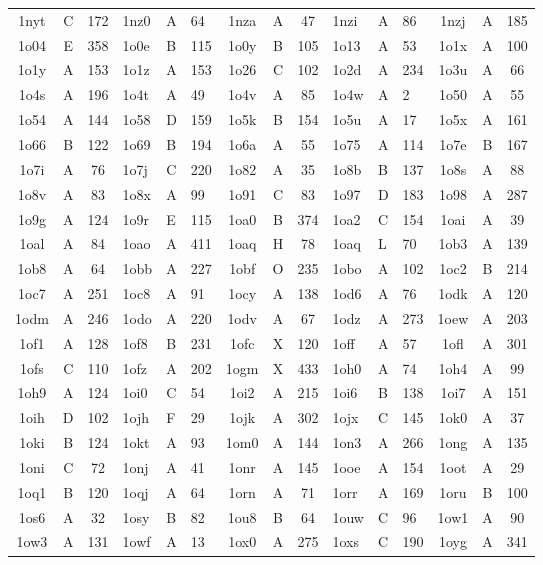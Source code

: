 \begin{longtable}{|c|c|c| a|a|a| c|c|c| a|a|a| c|c|c|}
1nyt & C & 172 & 1nz0 & A & 64 & 1nza & A & 47 & 1nzi & A & 86 & 1nzj & A & 185\\
1o04 & E & 358 & 1o0e & B & 115 & 1o0y & B & 105 & 1o13 & A & 53 & 1o1x & A & 100\\
1o1y & A & 153 & 1o1z & A & 153 & 1o26 & C & 102 & 1o2d & A & 234 & 1o3u & A & 66\\
1o4s & A & 196 & 1o4t & A & 49 & 1o4v & A & 85 & 1o4w & A & 2 & 1o50 & A & 55\\
1o54 & A & 144 & 1o58 & D & 159 & 1o5k & B & 154 & 1o5u & A & 17 & 1o5x & A & 161\\
1o66 & B & 122 & 1o69 & B & 194 & 1o6a & A & 55 & 1o75 & A & 114 & 1o7e & B & 167\\
1o7i & A & 76 & 1o7j & C & 220 & 1o82 & A & 35 & 1o8b & B & 137 & 1o8s & A & 88\\
1o8v & A & 83 & 1o8x & A & 99 & 1o91 & C & 83 & 1o97 & D & 183 & 1o98 & A & 287\\
1o9g & A & 124 & 1o9r & E & 115 & 1oa0 & B & 374 & 1oa2 & C & 154 & 1oai & A & 39\\
1oal & A & 84 & 1oao & A & 411 & 1oaq & H & 78 & 1oaq & L & 70 & 1ob3 & A & 139\\
1ob8 & A & 64 & 1obb & A & 227 & 1obf & O & 235 & 1obo & A & 102 & 1oc2 & B & 214\\
1oc7 & A & 251 & 1oc8 & A & 91 & 1ocy & A & 138 & 1od6 & A & 76 & 1odk & A & 120\\
1odm & A & 246 & 1odo & A & 220 & 1odv & A & 67 & 1odz & A & 273 & 1oew & A & 203\\
1of1 & A & 128 & 1of8 & B & 231 & 1ofc & X & 120 & 1off & A & 57 & 1ofl & A & 301\\
1ofs & C & 110 & 1ofz & A & 202 & 1ogm & X & 433 & 1oh0 & A & 74 & 1oh4 & A & 99\\
1oh9 & A & 124 & 1oi0 & C & 54 & 1oi2 & A & 215 & 1oi6 & B & 138 & 1oi7 & A & 151\\
1oih & D & 102 & 1ojh & F & 29 & 1ojk & A & 302 & 1ojx & C & 145 & 1ok0 & A & 37\\
1oki & B & 124 & 1okt & A & 93 & 1om0 & A & 144 & 1on3 & A & 266 & 1ong & A & 135\\
1oni & C & 72 & 1onj & A & 41 & 1onr & A & 145 & 1ooe & A & 154 & 1oot & A & 29\\
1oq1 & B & 120 & 1oqj & A & 64 & 1orn & A & 71 & 1orr & A & 169 & 1oru & B & 100\\
1os6 & A & 32 & 1osy & B & 82 & 1ou8 & B & 64 & 1ouw & C & 96 & 1ow1 & A & 90\\
1ow3 & A & 131 & 1owf & A & 13 & 1ox0 & A & 275 & 1oxs & C & 190 & 1oyg & A & 341\\

\end{longtable}
